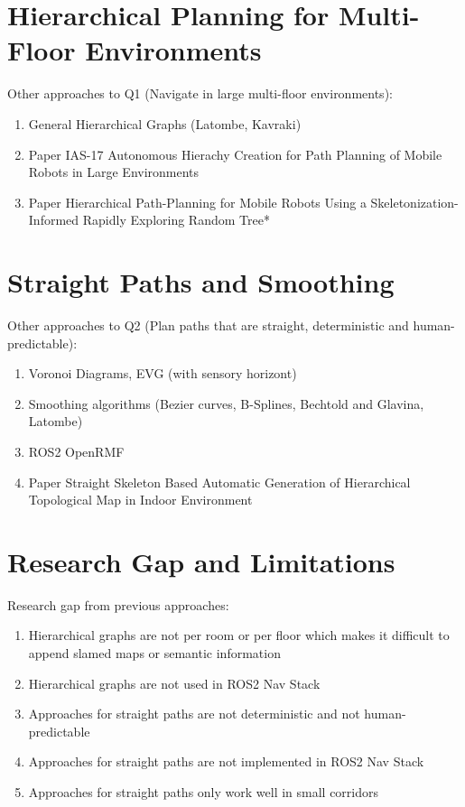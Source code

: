 \section{Hierarchical Planning for Multi-Floor Environments}
\label{sec:hierarchical_planning}

Other approaches to Q1 (Navigate in large multi-floor environments):
\begin{enumerate}
    \item General Hierarchical Graphs (Latombe, Kavraki)
    \item Paper IAS-17 Autonomous Hierachy Creation for Path Planning of Mobile Robots in Large Environments
    \item Paper Hierarchical Path-Planning for Mobile Robots Using a Skeletonization-Informed Rapidly Exploring Random Tree*
\end{enumerate}

\section{Straight Paths and Smoothing}
\label{sec:straight_paths}

Other approaches to Q2 (Plan paths that are straight, deterministic and human-predictable):

\begin{enumerate}
    \item Voronoi Diagrams, EVG (with sensory horizont)
    \item Smoothing algorithms (Bezier curves, B-Splines, Bechtold and Glavina, Latombe)
    \item ROS2 OpenRMF
    \item Paper Straight Skeleton Based Automatic Generation of Hierarchical Topological Map in Indoor Environment
\end{enumerate}

\section{Research Gap and Limitations}
\label{sec:research_gap}

Research gap from previous approaches:
\begin{enumerate}
    \item Hierarchical graphs are not per room or per floor which makes it difficult to append slamed maps or semantic information
    \item Hierarchical graphs are not used in ROS2 Nav Stack
    \item Approaches for straight paths are not deterministic and not human-predictable
    \item Approaches for straight paths are not implemented in ROS2 Nav Stack
    \item Approaches for straight paths only work well in small corridors
\end{enumerate}